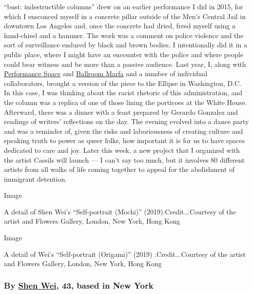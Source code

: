 ``bust: indestructible columns'' drew on an earlier performance I did in
2015, for which I ensconced myself in a concrete pillar outside of the
Men's Central Jail in downtown Los Angeles and, once the concrete had
dried, freed myself using a hand-chisel and a hammer. The work was a
comment on police violence and the sort of surveillance endured by black
and brown bodies. I intentionally did it in a public place, where I
might have an encounter with the police and where people could bear
witness and be more than a passive audience. Last year, I, along with
\href{https://performancespacenewyork.org/}{Performance Space} and
\href{https://www.ballroommarfa.org/}{Ballroom Marfa} and a number of
individual collaborators, brought a version of the piece to the Ellipse
in Washington, D.C. In this case, I was thinking about the racist
rhetoric of this administration, and the column was a replica of one of
those lining the porticoes at the White House. Afterward, there was a
dinner with a feast prepared by Gerardo Gonzalez and readings of
writers' reflections on the day. The evening evolved into a dance party
and was a reminder of, given the risks and laboriousness of creating
culture and speaking truth to power as queer folks, how important it is
for us to have spaces dedicated to care and joy. Later this week, a new
project that I organized with the artist Cassils will launch --- I can't
say too much, but it involves 80 different artists from all walks of
life coming together to appeal for the abolishment of immigrant
detention.

Image

A detail of Shen Wei's ``Self-portrait (Mochi)''
(2019).Credit...Courtesy of the artist and Flowers Gallery, London, New
York, Hong Kong

Image

A detail of Wei's ``Self-portrait (Origami)'' (2019) .Credit...Courtesy
of the artist and Flowers Gallery, London, New York, Hong Kong

\hypertarget{by-shen-wei-43-based-in-new-york}{%
\subsubsection{\texorpdfstring{\textbf{By}
\textbf{\href{http://shenwei.studio/}{Shen Wei}, 43, based in New
York}}{By Shen Wei, 43, based in New York}}\label{by-shen-wei-43-based-in-new-york}}


